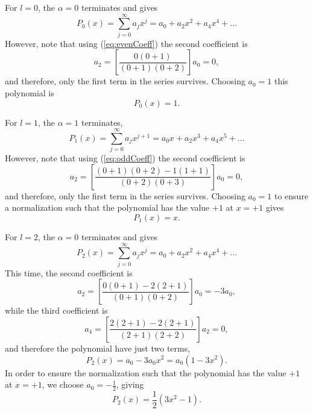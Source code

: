 For $l=0$, the $\alpha=0$ terminates and gives
\begin{equation}
 P_0(x) = \sum_{j=0}^\infty a_j x^j = a_0 + a_2 x^2 + a_4 x^4 + ... 
\end{equation}
However, note that using (\ref{eq:evenCoeff}) the second coefficient is
\begin{equation}
 a_{2}  =  \left[\frac{ 0( 0+1) }{ (0+1)( 0+2)  } \right] a_0 = 0,
\end{equation} 
and therefore, only the first term in the series survives. Choosing $a_0 = 1$ this polynomial is
\begin{equation}
 P_0 (x) = 1.
 \end{equation} 
 
 For $l=1$, the $\alpha=1$ terminates,
 \begin{equation}
 P_1(x) = \sum_{j=0}^\infty a_j x^{j+1} = a_0 x + a_2 x^3 + a_4 x^5 + ... 
\end{equation}
However, note that using (\ref{eq:oddCoeff}) the second coefficient is
\begin{equation}
 a_{2}  =  \left[\frac{ (0+1)(0+2) - 1(1+1) }{ ( 0+2)(0+3)  } \right] a_0= 0,
\end{equation} 
and therefore, only the first term in the series survives. Choosing $a_0 = 1$ to ensure a normalization such that the polynomial has the value $+1$ at $x=+1$ gives
\begin{equation}
 P_1 (x) = x.
 \end{equation} 

For $l=2$, the $\alpha=0$ terminates and gives
\begin{equation}
 P_2(x) = \sum_{j=0}^\infty a_j x^j = a_0 + a_2 x^2 + a_4 x^4 + ... 
\end{equation}
This time, the second coefficient is
\begin{equation}
 a_{2}  =  \left[\frac{ 0( 0+1) - 2(2+1) }{ (0+1)( 0+2)  } \right] a_0 = -3a_0,
\end{equation} 
while the third coefficient is 
\begin{equation}
 a_{4}  =  \left[\frac{ 2( 2+1) - 2(2+1) }{ (2+1)( 2+2)  } \right] a_2 = 0,
\end{equation}
and therefore the polynomial have just two terms,
\begin{equation}
 P_2(x) = a_0 - 3a_0 x^2 = a_0 (1-3x^2).
\end{equation}
In order  to ensure the normalization such that the polynomial has the value $+1$ at $x=+1$, we choose $a_0 = -\frac{1}{2}$, giving 
\begin{equation}
P_2 (x) = \frac{1}{2} (3x^2 -1).
\end{equation}

